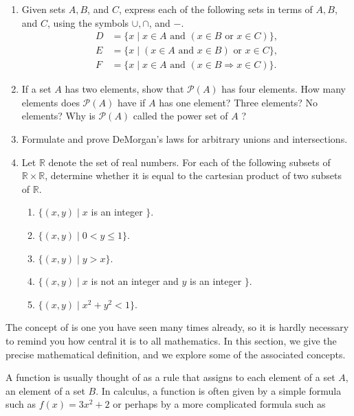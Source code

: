 \begin{enumerate}[itemsep=0.4em, parsep=0pt, topsep=0pt, partopsep=0pt, leftmargin=*, label=\arabic*., ref=\arabic*]
\item Given sets \(A,B\), and \(C\), express each of the following sets in terms of \(A,B\), and \(C\), using the symbols \(\cup , \cap\), and \(-\).
  \[
  \begin{aligned}
  D &= \{ x \mid x \in A\text{ and }({x \in B\text{ or }x \in C}) \}, \\
  E &= \{ x \mid ({x \in A\text{ and }x \in B}) \text{ or }x \in C\}, \\
  F &= \{ x \mid x \in A\text{ and }({x \in B \Rightarrow x \in C}) \}.
  \end{aligned}
  \]
\item If a set \(A\) has two elements, show that \(\mathcal{P}(A)\) has four elements. How many elements does \(\mathcal{P}(A)\) have if \(A\) has one element? Three elements? No elements? Why is \(\mathcal{P}(A)\) called the power set of \(A\) ?

\item Formulate and prove DeMorgan's laws for arbitrary unions and intersections.

\item Let \(\mathbb{R}\) denote the set of real numbers. For each of the following subsets of \(\mathbb{R} \times \mathbb{R}\), determine whether it is equal to the cartesian product of two subsets of \(\mathbb{R}\).
  \begin{enumerate}[itemsep=0.2em, parsep=0pt, topsep=0pt, partopsep=0pt, leftmargin=*, label=(\alph*), align=left]
  \item \(\{ ({x,y}) \mid x\) is an integer \(\}\).
  \item \(\{ ({x,y}) \mid 0 < y \leq 1\}\).
  \item \(\{ ({x,y}) \mid y > x\}\).
  \item \(\{ ({x,y}) \mid x\) is not an integer and \(y\) is an integer \(\}\).
  \item \(\{ {({x,y}) \mid {x}^{2} + y^{2} < 1}\}\).
  \end{enumerate}
\end{enumerate}


The concept of  is one you have seen many times already, 
so it is hardly necessary to remind you how central it is to all mathematics. 
In this section, we give the precise mathematical definition, 
and we explore some of the associated concepts.

A function is usually thought of as a rule that assigns to each element of a set \(A\), 
an element of a set \(B\). In calculus, a function is often given by 
a simple formula such as \(f(x) = 3x^{2} + 2\) or perhaps by 
a more complicated formula such as

